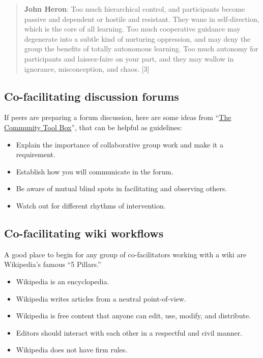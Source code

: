 \begin{quote}
\textbf{John Heron}: Too much hierarchical control, and participants
become passive and dependent or hostile and resistant. They wane in
self-direction, which is the core of all learning. Too much cooperative
guidance may degenerate into a subtle kind of nurturing oppression, and
may deny the group the benefits of totally autonomous learning. Too much
autonomy for participants and laissez-faire on your part, and they may
wallow in ignorance, misconception, and chaos. {[}3{]}
\end{quote}
\subsection{Co-facilitating discussion forums}

If peers are preparing a forum discussion, here are some ideas from
``\href{http://ctb.ku.edu/en/tablecontents/section\_1180.aspx}{The
Community Tool Box}'', that can be helpful as guidelines:

\begin{itemize}[noitemsep]
\item
  Explain the importance of collaborative group work and make it a
  requirement.
\item
  Establish how you will communicate in the forum.
\item
  Be aware of mutual blind spots in facilitating and observing others.
\item
  Watch out for different rhythms of intervention.
\end{itemize}
\subsection{Co-facilitating wiki workflows}

A good place to begin for any group of co-facilitators working with a
wiki are Wikipedia's famous ``5 Pillars.''

\begin{itemize}
\item
  Wikipedia is an encyclopedia.
\item
  Wikipedia writes articles from a neutral point-of-view.
\item
  Wikipedia is free content that anyone can edit, use, modify, and
  distribute.
\item
  Editors should interact with each other in a respectful and civil
  manner.
\item
  Wikipedia does not have firm rules.
\end{itemize}
